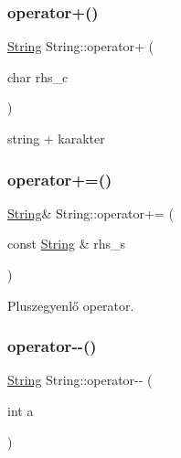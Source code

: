 \mbox{\label{class_string_afa169686af6b513e1f059cf2bf39695f}} 
\subsubsection{\texorpdfstring{operator+()}{operator+()}\hspace{0.1cm}{\footnotesize\ttfamily [2/2]}}
{\footnotesize\ttfamily \mbox{\hyperlink{class_string}{String}} String\+::operator+ (\begin{DoxyParamCaption}\item[{char}]{rhs\+\_\+c }\end{DoxyParamCaption})\hspace{0.3cm}{\ttfamily [inline]}}



string + karakter 

\mbox{\label{class_string_ac203e7c52e04bb86f62f9dd75527b361}} 
\subsubsection{\texorpdfstring{operator+=()}{operator+=()}}
{\footnotesize\ttfamily \mbox{\hyperlink{class_string}{String}}\& String\+::operator+= (\begin{DoxyParamCaption}\item[{const \mbox{\hyperlink{class_string}{String}} \&}]{rhs\+\_\+s }\end{DoxyParamCaption})\hspace{0.3cm}{\ttfamily [inline]}}



Pluszegyenlő operator. 

\mbox{\label{class_string_a79869b69dd0106b1b6d179f760d6527a}} 
\subsubsection{\texorpdfstring{operator-\/-\/()}{operator--()}}
{\footnotesize\ttfamily \mbox{\hyperlink{class_string}{String}} String\+::operator-\/-\/ (\begin{DoxyParamCaption}\item[{int}]{a }\end{DoxyParamCaption})}



